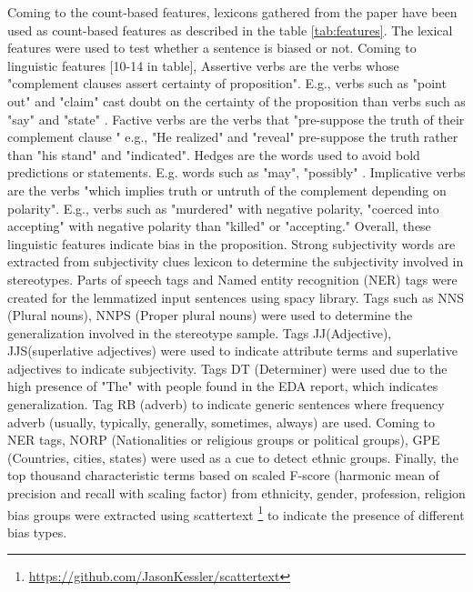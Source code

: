Coming to the count-based features, lexicons gathered from the paper  \cite{recasens2013linguistic}  have been used as count-based features as described in the table \ref{tab:features}. The lexical features were used to test whether a sentence is biased or not. Coming to linguistic features [10-14 in table], Assertive verbs \cite{hooper1975assertive} are the verbs whose "complement clauses assert certainty of proposition"\cite{recasens2013linguistic}. E.g., verbs such as "point out" and "claim" cast doubt on the certainty of the proposition than verbs such as "say" and "state" \cite{recasens2013linguistic}. Factive verbs \cite{kiparsky1970progress} are the verbs that "pre-suppose the truth of their complement clause "\cite{recasens2013linguistic} e.g., "He realized" and "reveal" pre-suppose the truth rather than  "his stand" and "indicated". Hedges are the words used to avoid bold predictions or statements. E.g. words such as "may", "possibly" \cite{recasens2013linguistic}. Implicative verbs \cite{karttunen1971implicative} are the verbs "which implies truth or untruth of the complement depending on polarity"\cite{recasens2013linguistic}. E.g., verbs such as "murdered" with negative polarity, "coerced into accepting" with negative polarity than "killed" or "accepting." Overall, these linguistic features indicate bias in the proposition. Strong subjectivity words are extracted from subjectivity clues lexicon \cite{wilson2005recognizing} to determine the subjectivity involved in stereotypes. Parts of speech tags and Named entity recognition (NER) tags were created for the lemmatized input sentences using spacy library. Tags such as NNS (Plural nouns), NNPS (Proper plural nouns) were used to determine the generalization involved in the stereotype sample. Tags JJ(Adjective), JJS(superlative adjectives) were used to indicate attribute terms and superlative adjectives to indicate subjectivity. Tags DT (Determiner) were used due to the high presence of "The" with people found in the EDA report, which indicates generalization. Tag RB (adverb) to indicate generic sentences where frequency adverb (usually, typically, generally, sometimes, always) are used. Coming to NER tags, NORP (Nationalities or religious groups or political groups), GPE (Countries, cities, states) were used as a cue to detect ethnic groups. Finally, the top thousand characteristic terms based on scaled F-score (harmonic mean of precision and recall with scaling factor) from ethnicity, gender, profession, religion bias groups were extracted using scattertext \footnote{\url{https://github.com/JasonKessler/scattertext}} to indicate the presence of different bias types.

